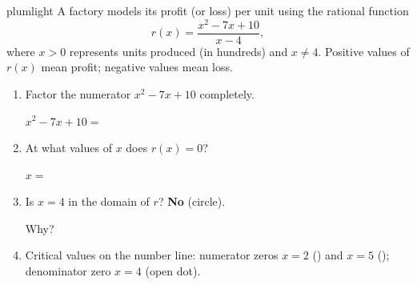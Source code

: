 \documentclass[10pt]{article}
\begin{document}
\namepartnerperiod

\vspace{0.10in}

\begin{scenariobox}{plumlight}
\small
A factory models its profit (or loss) per unit using the rational function
\[
  r(x) = \frac{x^2 - 7x + 10}{x - 4},
\]
where $x > 0$ represents units produced (in hundreds) and $x \ne 4$.
Positive values of $r(x)$ mean profit; negative values mean loss.
\end{scenariobox}

\vspace{0.08in}

\begin{tcolorbox}[colback=white, colframe=black!40,
    title=\textbf{Tier R --- Remediate},
    fonttitle=\bfseries, arc=2mm, left=3mm, right=3mm, top=2mm, bottom=2mm]

\begin{enumerate}[itemsep=10pt]

  \item Factor the numerator $x^2 - 7x + 10$ completely.

        $x^2 - 7x + 10 = $ 

  \item At what values of $x$ does $r(x) = 0$?

        $x = $ 

  \item Is $x = 4$ in the domain of $r$? \quad \textbf{No} (circle).

        Why? 

  \item Critical values on the number line: numerator zeros $x = 2$ (\textbullet) and $x = 5$ (\textbullet);
        denominator zero $x = 4$ (open dot).

        \vspace{0.18in}
        \begin{center}
        \end{center}
\end{enumerate}
\end{tcolorbox}
\end{document}
